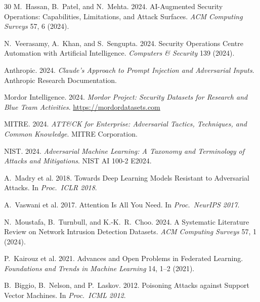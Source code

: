 \documentclass[sigconf,nonacm]{acmart}
\begin{document}
\begin{thebibliography}{30}
M.~Hassan, B.~Patel, and N.~Mehta. 2024. AI-Augmented Security
Operations: Capabilities, Limitations, and Attack Surfaces.
\textit{ACM Computing Surveys} 57, 6 (2024).

N.~Veerasamy, A.~Khan, and S.~Sengupta. 2024. Security Operations
Centre Automation with Artificial Intelligence.
\textit{Computers \& Security} 139 (2024).

Anthropic. 2024. \textit{Claude's Approach to Prompt Injection
and Adversarial Inputs}. Anthropic Research Documentation.

Mordor Intelligence. 2024. \textit{Mordor Project: Security
Datasets for Research and Blue Team Activities}.
\url{https://mordordatasets.com}

MITRE. 2024. \textit{ATT\&CK for Enterprise: Adversarial Tactics,
Techniques, and Common Knowledge}. MITRE Corporation.

NIST. 2024. \textit{Adversarial Machine Learning: A Taxonomy and
Terminology of Attacks and Mitigations}. NIST AI 100-2 E2024.

A.~Madry et al. 2018. Towards Deep Learning Models Resistant to
Adversarial Attacks. In \textit{Proc.\ ICLR 2018}.

A.~Vaswani et al. 2017. Attention Is All You Need.
In \textit{Proc.\ NeurIPS 2017}.

N.~Moustafa, B.~Turnbull, and K.-K.~R.~Choo. 2024. A Systematic
Literature Review on Network Intrusion Detection Datasets.
\textit{ACM Computing Surveys} 57, 1 (2024).

P.~Kairouz et al. 2021. Advances and Open Problems in Federated
Learning. \textit{Foundations and Trends in Machine Learning} 14,
1--2 (2021).

B.~Biggio, B.~Nelson, and P.~Laskov. 2012. Poisoning Attacks
against Support Vector Machines. In \textit{Proc.\ ICML 2012}.

\end{thebibliography}
\end{document}
